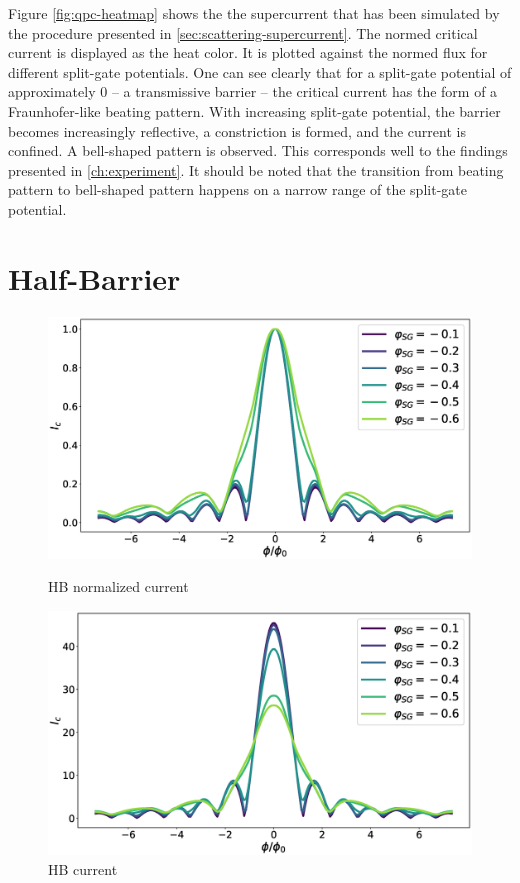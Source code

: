 Figure \ref{fig:qpc-heatmap} shows the the supercurrent that has been simulated by the procedure presented in \ref{sec:scattering-supercurrent}. The normed critical current is displayed as the heat color. It is plotted against the normed flux for different split-gate potentials. One can see clearly that for a split-gate potential of approximately 0 -- a transmissive barrier -- the critical current has the form of a Fraunhofer-like beating pattern. With increasing split-gate potential, the barrier becomes increasingly reflective, a constriction is formed, and the current is confined. A bell-shaped pattern is observed. This corresponds well to the findings presented in \ref{ch:experiment}. It should be noted that the transition from beating pattern to bell-shaped pattern happens on a narrow range of the split-gate potential.

\section{Half-Barrier}

\begin{figure}[ht]
\begin{minipage}[b]{0.49\linewidth}
\centering
\includegraphics[width=\textwidth]{figure/numericalmodel/hb_upper}
\caption{HB normalized current } \label{fig:hb-norm}
\end{minipage}
\begin{minipage}[b]{0.49\linewidth}
\centering
\includegraphics[width=\textwidth]{figure/numericalmodel/hb_upper_abs}
\caption{HB current}\label{fig:hb-abs}
\end{minipage}
\end{figure}

